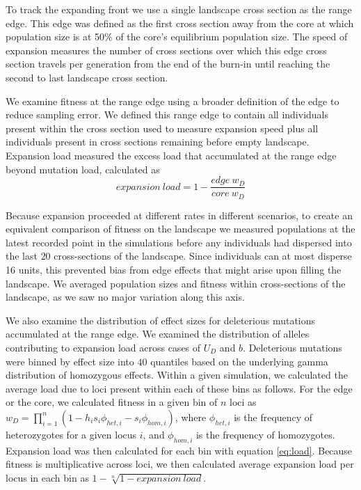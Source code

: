 To track the expanding front we use a single landscape cross section as the range edge. This edge was defined as the first cross section away from the core at which population size is at 50\% of the core's equilibrium population size. The speed of expansion measures the number of cross sections over which this edge cross section travels per generation from the end of the burn-in until reaching the second to last landscape cross section.

We examine fitness at the range edge using a broader definition of the edge to reduce sampling error. We defined this range edge to contain all individuals present within the cross section used to measure expansion speed plus all individuals present in cross sections remaining before empty landscape. Expansion load measured the excess load that accumulated at the range edge beyond mutation load, calculated as 
\begin{equation}
\label{eq:load}
expansion~load = 1 - \frac{edge ~ w_D}{core ~ w_D}
\end{equation}

Because expansion proceeded at different rates in different scenarios, to create an equivalent comparison of fitness on the landscape we measured populations at the latest recorded point in the simulations before any individuals had dispersed into the last $20$ cross-sections of the landscape. Since individuals can at most disperse 16 units, this prevented bias from edge effects that might arise upon filling the landscape. We averaged population sizes and fitness within cross-sections of the landscape, as we saw no major variation along this axis.

We also examine the distribution of effect sizes for deleterious mutations accumulated at the range edge. We examined the distribution of alleles contributing to expansion load across cases of $U_D$ and $b$. Deleterious mutations were binned by effect size into $40$ quantiles based on the underlying gamma distribution of homozygous effects. Within a given simulation, we calculated the average load due to loci present within each of these bins as follows. For the edge or the core, we calculated fitness in a given bin  of $n$ loci as $w_D =  \prod_{i=1}^{n} (1 - h_i s_i \phi_{het,i} - s_i \phi_{hom,i})$, where $\phi_{het,i}$ is the frequency of heterozygotes for a given locus $i$, and $\phi_{hom,i}$ is the frequency of homozygotes. Expansion load was then calculated for each bin with equation \eqref{eq:load}. Because fitness is multiplicative across loci, we then calculated average expansion load per locus in each bin as $1 - \sqrt[n]{1 - expansion~load}$.

